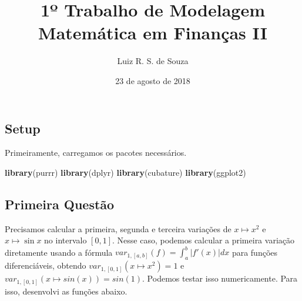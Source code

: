 \documentclass[]{article}
\title{1º Trabalho de Modelagem Matemática em Finanças II}
\author{Luiz R. S. de Souza}
\date{23 de agosto de 2018}
\newenvironment{Shaded}{\begin{snugshade}}{\end{snugshade}}
\newcommand{\KeywordTok}[1]{\textcolor[rgb]{0.13,0.29,0.53}{\textbf{#1}}}
\newcommand{\NormalTok}[1]{#1}
\begin{document}
\maketitle

\subsection{Setup}\label{setup}

Primeiramente, carregamos os pacotes necessários.

\begin{Shaded}
\begin{Highlighting}[]
\KeywordTok{library}\NormalTok{(purrr)}
\KeywordTok{library}\NormalTok{(dplyr)}
\KeywordTok{library}\NormalTok{(cubature)}
\KeywordTok{library}\NormalTok{(ggplot2)}
\end{Highlighting}
\end{Shaded}

\subsection{Primeira Questão}\label{primeira-questao}

Precisamos calcular a primeira, segunda e terceira variações de
\(x \mapsto x^2\) e \(x \mapsto \sin x\) no intervalo \([0,1]\). Nesse
caso, podemos calcular a primeira variação diretamente usando a fórmula
\(var_{1, [a, b]}(f) = \int_a^b \lvert f'(x) \rvert dx\) para funções
diferenciáveis, obtendo \(var_{1, [0, 1]}(x \mapsto x^2) = 1\) e
\(var_{1, [0, 1]}(x \mapsto sin(x)) = sin(1)\). Podemos testar isso
numericamente. Para isso, desenvolvi as funções abaixo.
\end{document}
